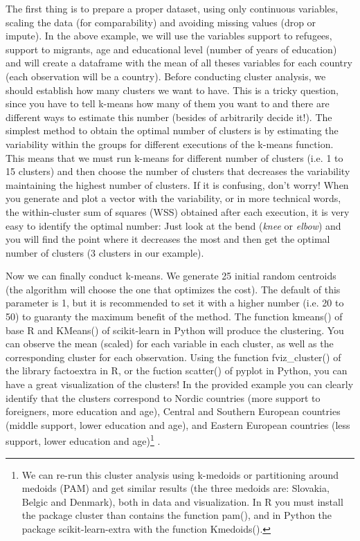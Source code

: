 The first thing is to prepare a proper dataset, using only continuous variables, scaling the data (for comparability) and avoiding missing values (drop or impute). In the above example, we will use the variables support to refugees, support to migrants, age and educational level (number of years of education) and will create a dataframe with the mean of all theses variables for each country (each observation will be a country). Before conducting cluster analysis, we should establish how many clusters we want to have. This is a tricky question, since you have to tell k-means how many of them you want to and there are different ways to estimate this number (besides of arbitrarily decide it!). The simplest method to obtain the optimal number of clusters is by estimating the variability within the groups for different executions of the k-means function. This means that we must run k-means for different number of clusters (i.e. 1 to 15 clusters) and then choose the number of clusters that decreases the variability maintaining the highest number of clusters. If it is confusing, don’t worry!  When you generate and plot a vector with the variability, or in more technical words, the within-cluster sum of squares (WSS) obtained after each execution, it is very easy to identify the optimal number: Just look at the bend (\textit{knee} or \textit{elbow}) and you will find the point where it decreases the most and then get the optimal number of clusters (3 clusters in our example).


Now we can finally conduct k-means. We generate 25 initial random centroids (the algorithm will choose the one that optimizes the cost). The default of this parameter is 1, but it is recommended to set it with a higher number (i.e. 20 to 50) to guaranty the maximum benefit of the method. The function kmeans() of base R and KMeans() of scikit-learn in Python will produce the clustering. You can observe the mean (scaled) for each variable in each cluster, as well as the corresponding cluster for each observation. Using the function fviz\_cluster() of the library factoextra in R, or the fuction scatter() of pyplot  in Python, you can have a great visualization of the clusters! In the provided example you can clearly identify that the clusters correspond to Nordic countries (more support to foreigners, more education and age), Central and Southern European countries (middle support, lower education and age), and Eastern European countries (less support, lower education and age)\footnote{We can re-run this cluster analysis using k-medoids or partitioning around medoids (PAM) and get similar results (the three medoids are: Slovakia, Belgic and Denmark), both in data and visualization. In R you must install the package cluster than contains the function pam(), and in Python the package scikit-learn-extra with the function Kmedoids().} .

